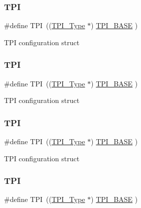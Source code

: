 \subsubsection{\texorpdfstring{T\+PI}{TPI}\hspace{0.1cm}{\footnotesize\ttfamily [2/8]}}
{\footnotesize\ttfamily \#define T\+PI~((\hyperlink{struct_t_p_i___type}{T\+P\+I\+\_\+\+Type}       $\ast$)     \hyperlink{group___c_m_s_i_s__core__base_ga2b1eeff850a7e418844ca847145a1a68}{T\+P\+I\+\_\+\+B\+A\+SE}         )}

T\+PI configuration struct \mbox{\label{group___c_m_s_i_s__core__base_ga8b4dd00016aed25a0ea54e9a9acd1239}} 
\subsubsection{\texorpdfstring{T\+PI}{TPI}\hspace{0.1cm}{\footnotesize\ttfamily [3/8]}}
{\footnotesize\ttfamily \#define T\+PI~((\hyperlink{struct_t_p_i___type}{T\+P\+I\+\_\+\+Type}       $\ast$)     \hyperlink{group___c_m_s_i_s__core__base_ga2b1eeff850a7e418844ca847145a1a68}{T\+P\+I\+\_\+\+B\+A\+SE}      )}

T\+PI configuration struct \mbox{\label{group___c_m_s_i_s__core__base_ga8b4dd00016aed25a0ea54e9a9acd1239}} 
\subsubsection{\texorpdfstring{T\+PI}{TPI}\hspace{0.1cm}{\footnotesize\ttfamily [4/8]}}
{\footnotesize\ttfamily \#define T\+PI~((\hyperlink{struct_t_p_i___type}{T\+P\+I\+\_\+\+Type}       $\ast$)     \hyperlink{group___c_m_s_i_s__core__base_ga2b1eeff850a7e418844ca847145a1a68}{T\+P\+I\+\_\+\+B\+A\+SE}      )}

T\+PI configuration struct \mbox{\label{group___c_m_s_i_s__core__base_ga8b4dd00016aed25a0ea54e9a9acd1239}} 
\subsubsection{\texorpdfstring{T\+PI}{TPI}\hspace{0.1cm}{\footnotesize\ttfamily [5/8]}}
{\footnotesize\ttfamily \#define T\+PI~((\hyperlink{struct_t_p_i___type}{T\+P\+I\+\_\+\+Type}       $\ast$)     \hyperlink{group___c_m_s_i_s__core__base_ga2b1eeff850a7e418844ca847145a1a68}{T\+P\+I\+\_\+\+B\+A\+SE}      )}

